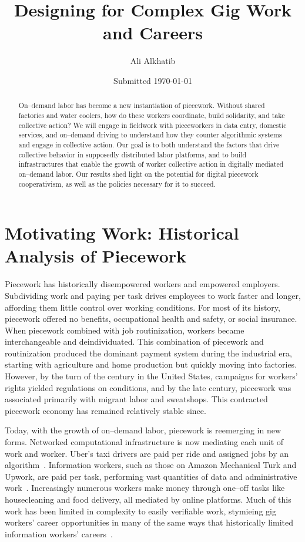 \documentclass{article}
\title{Designing for Complex Gig Work and Careers}
\author{Ali Alkhatib}
\date{Submitted \today}
\newcommand{\topic}[1]{{\color{Blue}#1}}
\begin{document}
  \begin{abstract}
On--demand labor has become a new instantiation of piecework.
Without shared factories and water coolers,
how do these workers coordinate,
build solidarity,
and take collective action?
We will engage in fieldwork with pieceworkers in data entry,
domestic services,
and on--demand driving to understand how they counter algorithmic systems and engage in collective action.
Our goal is to both understand the factors that drive collective behavior in supposedly distributed labor platforms,
and to build infrastructures that enable the growth of worker collective action in digitally mediated on--demand labor.
Our results shed light on the potential for digital piecework cooperativism,
as well as the policies necessary for it to succeed. %
  \end{abstract}


\section*{Motivating Work: Historical Analysis of Piecework}
\topic{Piecework has historically disempowered workers and empowered employers.}
Subdividing work and paying per task drives employees to work faster and longer,
affording them little control over working conditions.
For most of its history, piecework offered no benefits, occupational health and safety, or social insurance.
When piecework combined with job routinization, workers became interchangeable and deindividuated.
This combination of piecework and routinization produced the dominant payment system during the industrial era,
starting with agriculture and home production but quickly moving into factories.
However, by the turn of the  century in the United States,
campaigns for workers' rights yielded regulations on conditions, and by the late  century,
piecework was associated primarily with migrant labor and sweatshops.
This contracted piecework economy has remained relatively stable since.

\topic{Today, with the growth of on--demand labor, piecework is reemerging in new forms.}
Networked computational infrastructure is now mediating each unit of work and worker.
Uber's taxi drivers are paid per ride and assigned jobs by an algorithm~\cite{uberAlgorithm,hall2015analysis}.
Information workers, such as those on Amazon Mechanical Turk and Upwork, are paid per task,
performing vast quantities of data and administrative work~\cite{martin2014being}.
Increasingly numerous workers make money through one--off tasks like housecleaning and food delivery, all mediated by online platforms.
Much of this work has been limited in complexity to easily verifiable work, stymieing gig workers' career opportunities
in many of the same ways that historically limited information workers' careers~\cite{grier2013computers}.
\end{document}
